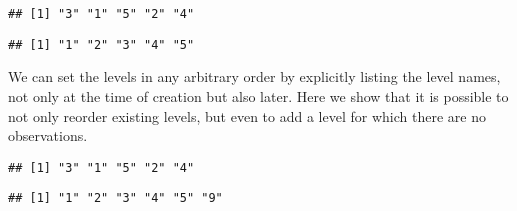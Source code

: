 \documentclass[krantz2]{krantz}\usepackage{knitr}%
\begin{document}
\begin{explainbox}
\begin{knitrout}\footnotesize
{}\color{fgcolor}\begin{kframe}
\begin{alltt}
 \hlkwb{<-} 
                 \hlstd{=} \hlstd{(}
\hlopt{$}
\end{alltt}
\begin{verbatim}
## [1] "3" "1" "5" "2" "4"
\end{verbatim}
\begin{alltt}
\end{alltt}
\begin{verbatim}
## [1] "1" "2" "3" "4" "5"
\end{verbatim}
\end{kframe}
\end{knitrout}

We can set the levels in any arbitrary order by explicitly listing the level names, not only at the time of creation but also later. Here we show that it is possible to not only reorder existing levels, but even to add a level for which there are no observations.

\begin{knitrout}\footnotesize
{}\color{fgcolor}\begin{kframe}
\begin{alltt}
 \hlkwb{<-} 
                 \hlstd{=} \hlstd{(}\hlstd{,} \hlstd{,} \hlstd{,} \hlstd{,} \hlstd{,} \hlstd{)))}
\hlopt{$}
\end{alltt}
\begin{verbatim}
## [1] "3" "1" "5" "2" "4"
\end{verbatim}
\begin{alltt}
\end{alltt}
\begin{verbatim}
## [1] "1" "2" "3" "4" "5" "9"
\end{verbatim}
\end{kframe}
\end{knitrout}

\end{explainbox}
\end{document}
